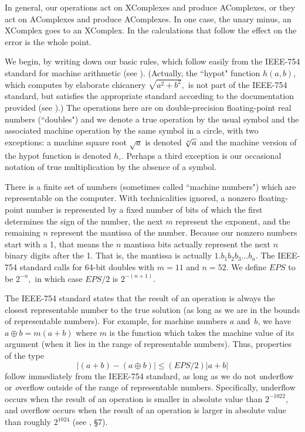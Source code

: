 \begin{remark}\label{GMT 7.3}
In general,  our operations  act on XComplexes and produce AComplexes, or they act on AComplexes and produce
 AComplexes.  In one case, the unary minus, an XComplex goes to an XComplex.  
In the calculations that follow the effect on the error is the whole point.\end{remark}

\begin{conventions} \label{GMT cs7.4}
We begin, by writing down our basic rules, which follow easily from the IEEE-754 standard for machine arithmetic (see \cite{IEEE}).
(Actually,  the ``hypot" function $h(a,b)$, which computes by elaborate chicanery $\sqrt{a^2 + b^2},$ is not part of the IEEE-754 standard, but  satisfies the appropriate standard according to the documentation provided (see \cite{K1}).)  The operations here are on
double-precision floating-point real numbers (``doubles") and we denote a true operation by the usual symbol and the associated machine operation by the same symbol in a circle, with two exceptions: a machine square root $\sqrt a$ is denoted $\root o \of a$ and the machine version of the hypot function is denoted $h_\circ$.  Perhaps a third exception is our occasional notation of true multiplication by the absence of a symbol.  

There is a finite set of numbers (sometimes called ``machine numbers") which are representable on the computer.  With
technicalities ignored,    a nonzero floating-point number is represented by a fixed number of bits of which
the first determines the sign of the number, the next $m$ represent the exponent, and the remaining $n$ represent the
mantissa of the number.  Because our nonzero numbers start with a 1, that means the $n$ mantissa bits actually represent
the next
$n$ binary digits after the 1.  That is, the mantissa is actually $1.b_1b_2b_3...b_{n}.$   The IEEE-754 standard calls for
64-bit doubles with $m = 11$ and $n = 52.$  We define $EPS$ to be $2^{-n},$ in which case $EPS/2$ is $2^{-(n + 1)}.$  

The IEEE-754 standard states that the result of an operation
 is always the closest representable number to the true solution (as long as we are in the bounds of representable
numbers).  For example, for machine numbers $a$ and~$b$, we have $a \oplus b = m(a+b)$ where $m$ is the function which
takes the machine value of its argument (when it lies in the range of representable numbers).  Thus, properties of the type
$$|(a + b) - (a \oplus b)| \leq (EPS/2) |a + b|$$
follow immediately from the IEEE-754 standard, as long as we do not {\textit underflow} or {\textit overflow} outside of the range of representable numbers. 
Specifically, underflow occurs when the result of an operation is smaller in absolute value than $2^{-1022}$,
 and overflow occurs when the result of an operation is larger in absolute value than roughly $2^{1024}$
	(see \cite{IEEE}, \S 7).


\end{conventions}
